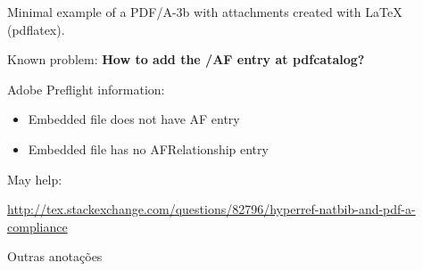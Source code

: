 \documentclass{article}
\begin{document}
Minimal example of a PDF/A-3b with attachments created with LaTeX (pdflatex).

Known problem: \textbf{How to add the /AF entry at pdfcatalog?}

Adobe Preflight information:
\begin{itemize}
  \item Embedded file does not have AF entry
  \item Embedded file has no AFRelationship entry
\end{itemize}


May help:

\url{http://tex.stackexchange.com/questions/82796/hyperref-natbib-and-pdf-a-compliance}


Outras anotações

%
%
%
% 
%
\end{document}
